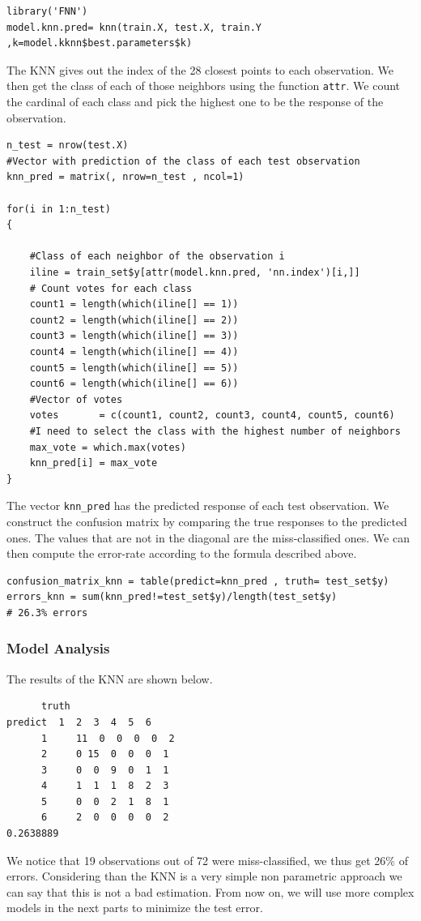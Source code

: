 \documentclass[]{report}
\begin{document}
\begin{lstlisting}
library('FNN')
model.knn.pred= knn(train.X, test.X, train.Y ,k=model.kknn$best.parameters$k)
\end{lstlisting}

The KNN gives out the index of the 28 closest points to each observation. We then get the class of each of those neighbors using the function \texttt{attr}. We count the cardinal of each class and pick the highest one to be the response of the observation.
\pagebreak

\begin{lstlisting}
n_test = nrow(test.X)
#Vector with prediction of the class of each test observation
knn_pred = matrix(, nrow=n_test , ncol=1) 

for(i in 1:n_test)
{

    #Class of each neighbor of the observation i
    iline = train_set$y[attr(model.knn.pred, 'nn.index')[i,]]
    # Count votes for each class
    count1 = length(which(iline[] == 1)) 
    count2 = length(which(iline[] == 2)) 
    count3 = length(which(iline[] == 3)) 
    count4 = length(which(iline[] == 4)) 
    count5 = length(which(iline[] == 5)) 
    count6 = length(which(iline[] == 6)) 
    #Vector of votes
    votes       = c(count1, count2, count3, count4, count5, count6)
    #I need to select the class with the highest number of neighbors
    max_vote = which.max(votes)
    knn_pred[i] = max_vote
}
\end{lstlisting}
The vector \texttt{knn\_pred} has the predicted response of each test observation. We construct the confusion matrix by comparing the true responses to the predicted ones. The values that are not in the diagonal are the miss-classified ones. We can then compute the error-rate according to the formula described above.
\begin{lstlisting}
confusion_matrix_knn = table(predict=knn_pred , truth= test_set$y)
errors_knn = sum(knn_pred!=test_set$y)/length(test_set$y)
# 26.3% errors
\end{lstlisting}
\pagebreak
\subsubsection{Model Analysis}
The results of the KNN are shown below.
\begin{verbatim}
      truth
predict  1  2  3  4  5  6
      1 	11  0  0  0  0  2
      2  	0 15  0  0  0  1
      3  	0  0  9  0  1  1
      4  	1  1  1  8  2  3
      5  	0  0  2  1  8  1
      6  	2  0  0  0  0  2
0.2638889
\end{verbatim}
We notice that 19 observations out of 72 were miss-classified, we thus get 26\% of errors. Considering than the KNN is a very simple non parametric approach we can say that this is not a bad estimation. From now on, we will use more complex models in the next parts to minimize the test error. 
\end{document}
